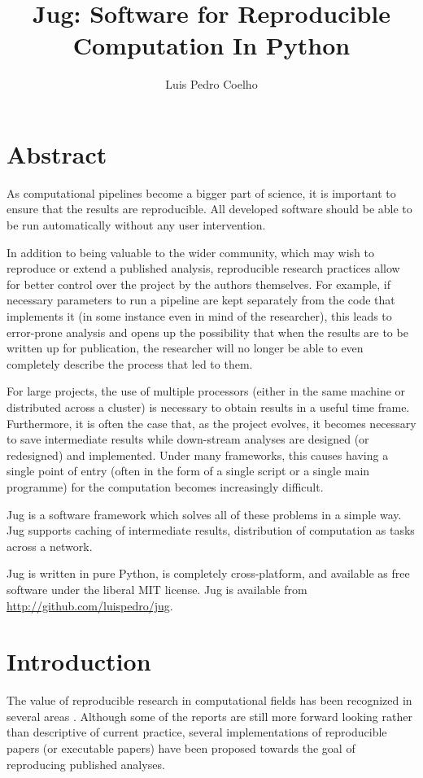 \documentclass{article}
\title{Jug: Software for Reproducible Computation In Python}
\author{Luis Pedro Coelho}
\begin{document}
\maketitle

\section*{Abstract}
As computational pipelines become a bigger part of science, it is important to
ensure that the results are reproducible. All developed software should be able
to be run automatically without any user intervention.

In addition to being valuable to the wider community, which may wish to
reproduce or extend a published analysis, reproducible research practices allow
for better control over the project by the authors themselves. For example, if
necessary parameters to run a pipeline are kept separately from the code that
implements it (in some instance even in mind of the researcher), this leads to
error-prone analysis and opens up the possibility that when the results are to
be written up for publication, the researcher will no longer be able to even
completely describe the process that led to them.

For large projects, the use of multiple processors (either in the same machine
or distributed across a cluster) is necessary to obtain results in a useful
time frame. Furthermore, it is often the case that, as the project evolves, it
becomes necessary to save intermediate results while down-stream analyses are
designed (or redesigned) and implemented. Under many frameworks, this causes
having a single point of entry (often in the form of a single script or a
single main programme) for the computation becomes increasingly difficult.

Jug is a software framework which solves all of these problems in a simple way.
Jug supports caching of intermediate results, distribution of computation as
tasks across a network.

Jug is written in pure Python, is completely cross-platform, and available as
free software under the liberal MIT license. Jug is available from
\url{http://github.com/luispedro/jug}.
\bigskip
\bigskip

\section{Introduction}
The value of reproducible research in computational fields has been recognized
in several areas \citep{Vandewalle2009,Nordlie2009}. Although some of the
reports are still more forward looking rather than descriptive of current
practice, several implementations of reproducible papers (or executable papers)
have been proposed towards the goal of reproducing published analyses.
\end{document}
